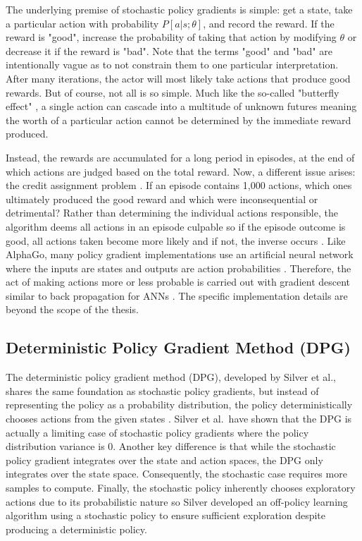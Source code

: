 The underlying premise of stochastic policy gradients is simple: get a state, take a particular action with probability $P[a|s;\theta]$, and record the reward. If the reward is "good", increase the probability of taking that action by modifying $\theta$ or decrease it if the reward is "bad". Note that the terms "good" and "bad" are intentionally vague as to not constrain them to one particular interpretation. After many iterations, the actor will most likely take actions that produce good rewards. But of course, not all is so simple. Much like the so-called "butterfly effect" \cite{Lorenz_1963}, a single action can cascade into a multitude of unknown futures meaning the worth of a particular action cannot be determined by the immediate reward produced. 

Instead, the rewards are accumulated for a long period in episodes, at the end of which actions are judged based on the total reward. Now, a different issue arises: the credit assignment problem \cite{fu_2008}. If an episode contains 1,000 actions, which ones ultimately produced the good reward and which were inconsequential or detrimental? Rather than determining the individual actions responsible, the algorithm deems all actions in an episode culpable so if the episode outcome is good, all actions taken become more likely and if not, the inverse occurs \cite{karpathy_2016}. Like AlphaGo, many policy gradient implementations use an artificial neural network where the inputs are states and outputs are action probabilities \cite{silver_2017}. Therefore, the act of making actions more or less probable is carried out with gradient descent similar to back propagation for ANNs \cite{karpathy_2016}. The specific implementation details are beyond the scope of the thesis.

\subsection{Deterministic Policy Gradient Method (DPG)}
The deterministic policy gradient method (DPG), developed by Silver et al., shares the same foundation as stochastic policy gradients, but instead of representing the policy as a probability distribution, the policy deterministically chooses actions from the given states \cite{silver_lever_heess_degris_wierstra_riedmiller}. Silver et al.\ have shown that the DPG is actually a limiting case of stochastic policy gradients where the policy distribution variance is 0. Another key difference is that while the stochastic policy gradient integrates over the state and action spaces, the DPG only integrates over the state space. Consequently, the stochastic case requires more samples to compute. Finally, the stochastic policy inherently chooses exploratory actions due to its probabilistic nature so Silver developed an off-policy learning algorithm using a stochastic policy to ensure sufficient exploration despite producing a deterministic policy.

